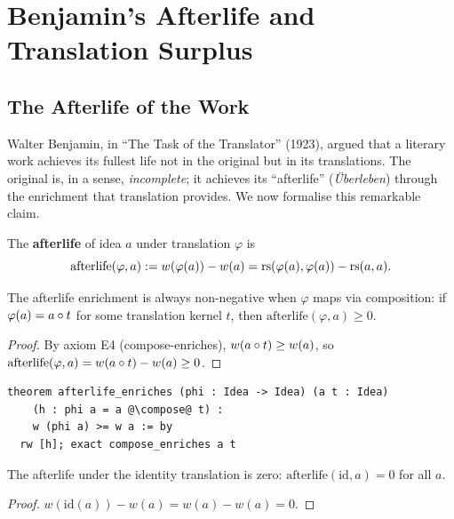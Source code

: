 \section{Benjamin's Afterlife and Translation Surplus}
\label{sec:translation:benjamin}

\subsection{The Afterlife of the Work}

Walter Benjamin, in ``The Task of the Translator'' (1923), argued that a
literary work achieves its fullest life not in the original but in its
translations.  The original is, in a sense, \emph{incomplete}; it achieves
its ``afterlife'' (\emph{\"Uberleben}) through the enrichment that
translation provides.  We now formalise this remarkable claim.

\begin{definition}
\label{def:afterlife}
The \textbf{afterlife} of idea $a$ under translation $\varphi$ is
\[
  \mathrm{afterlife}(\varphi, a) := w(\varphi(a)) - w(a)
    = \mathrm{rs}(\varphi(a), \varphi(a)) - \mathrm{rs}(a, a).
\]
\end{definition}

\begin{theorem}
\label{thm:afterlife-enriches}
The afterlife enrichment is always non-negative when $\varphi$ maps
via composition: if $\varphi(a) = a \circ t$ for some translation
kernel $t$, then $\mathrm{afterlife}(\varphi, a) \geq 0$.
\end{theorem}

\begin{proof}
By axiom E4 (compose-enriches), $w(a \circ t) \geq w(a)$, so
$\mathrm{afterlife}(\varphi, a) = w(a \circ t) - w(a) \geq 0$.
\end{proof}

\begin{lstlisting}
theorem afterlife_enriches (phi : Idea -> Idea) (a t : Idea)
    (h : phi a = a @\compose@ t) :
    w (phi a) >= w a := by
  rw [h]; exact compose_enriches a t
\end{lstlisting}

\begin{theorem}
\label{thm:afterlife-id}
The afterlife under the identity translation is zero:
$\mathrm{afterlife}(\mathrm{id}, a) = 0$ for all $a$.
\end{theorem}

\begin{proof}
$w(\mathrm{id}(a)) - w(a) = w(a) - w(a) = 0$.
\end{proof}

